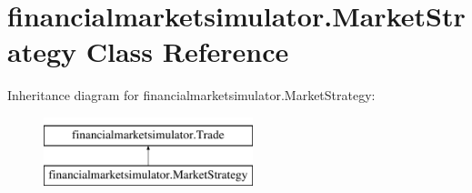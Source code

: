 \hypertarget{classfinancialmarketsimulator_1_1_market_strategy}{\section{financialmarketsimulator.\+Market\+Strategy Class Reference}
\label{classfinancialmarketsimulator_1_1_market_strategy}
}
Inheritance diagram for financialmarketsimulator.\+Market\+Strategy\+:\begin{figure}[H]
\begin{center}
\leavevmode
\includegraphics[height=2.000000cm]{classfinancialmarketsimulator_1_1_market_strategy}
\end{center}
\end{figure}
